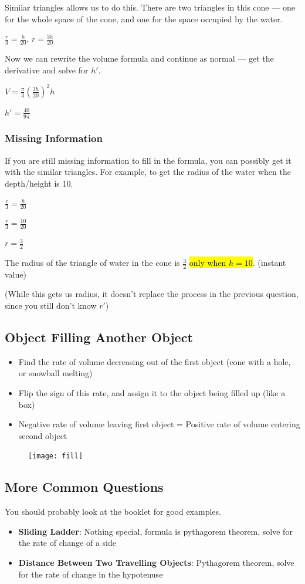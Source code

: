 \documentclass[a4paper,12pt]{article}
\begin{document}
Similar triangles allows us to do this. There are two triangles in this cone --- one for the whole space of the cone, and one for the space occupied by the water.

$\frac{r}{3} = \frac{h}{20}$, $r = \frac{3h}{20}$

Now we can rewrite the volume formula and continue as normal --- get the derivative and solve for $h'$.

$V = \frac{\pi}{3}(\frac{3h}{20})^2h$

$h' = \frac{40}{9\pi}$

\subsubsection{Missing Information}
If you are still missing information to fill in the formula, you can possibly get it with the similar triangles. For example, to get the radius of the water when the depth/height is 10.

$\frac{r}{3} = \frac{h}{20}$

$\frac{r}{3} = \frac{10}{20}$

$r = \frac{3}{2}$

The radius of the triangle of water in the cone is $\frac{3}{2}$ \hl{only when $h = 10$}. (instant value)

(While this gets us radius, it doesn't replace the process in the previous question, since you still don't know $r'$)

\pagebreak

\subsection{Object Filling Another Object}
\begin{itemize}
    \item{Find the rate of volume decreasing out of the first object (cone with a hole, or snowball melting)}
    \item{Flip the sign of this rate, and assign it to the object being filled up (like a box)}
    \item{Negative rate of volume leaving first object = Positive rate of volume entering second object}
\end{itemize}

\begin{figure}[H]
    \centering
    \texttt{[image: fill]}
\end{figure}

\pagebreak

\subsection{More Common Questions}
You should probably look at the booklet for good examples.
\begin{itemize}
    \item{\textbf{Sliding Ladder}: Nothing special, formula is pythagorem theorem, solve for the rate of change of a side}
    \item{\textbf{Distance Between Two Travelling Objects}: Pythagorem theorem, solve for the rate of change in the hypotenuse}
\end{itemize}
\end{document}
